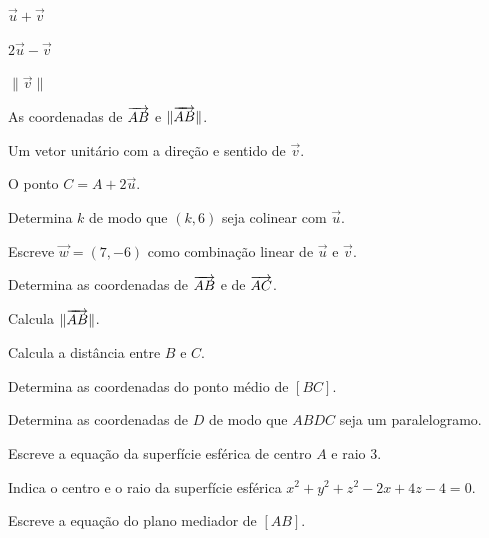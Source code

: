 \documentclass[12pt]{article}
\begin{document}


\begin{exercicios}
  \item $\vec u + \vec v$
  \item $2\vec u - \vec v$
  \item $\|\vec v\|$
  \item As coordenadas de $\overrightarrow{AB}$ e $\|\overrightarrow{AB}\|$.
  \item Um vetor unitário com a direção e sentido de $\vec v$.
  \item O ponto $C = A + 2\vec u$.
  \item Determina $k$ de modo que $(k, 6)$ seja colinear com $\vec u$.
  \item Escreve $\vec w = (7, -6)$ como combinação linear de $\vec u$ e $\vec v$.
\end{exercicios}

\begin{exercicios}
  \item Determina as coordenadas de $\overrightarrow{AB}$ e de $\overrightarrow{AC}$.
  \item Calcula $\|\overrightarrow{AB}\|$.
  \item Calcula a distância entre $B$ e $C$.
  \item Determina as coordenadas do ponto médio de $[BC]$.
  \item Determina as coordenadas de $D$ de modo que $ABDC$ seja um paralelogramo.
  \item Escreve a equação da superfície esférica de centro $A$ e raio 3.
  \item Indica o centro e o raio da superfície esférica $x^2 + y^2 + z^2 - 2x + 4z - 4 = 0$.
  \item Escreve a equação do plano mediador de $[AB]$.
\end{exercicios}
\end{document}
